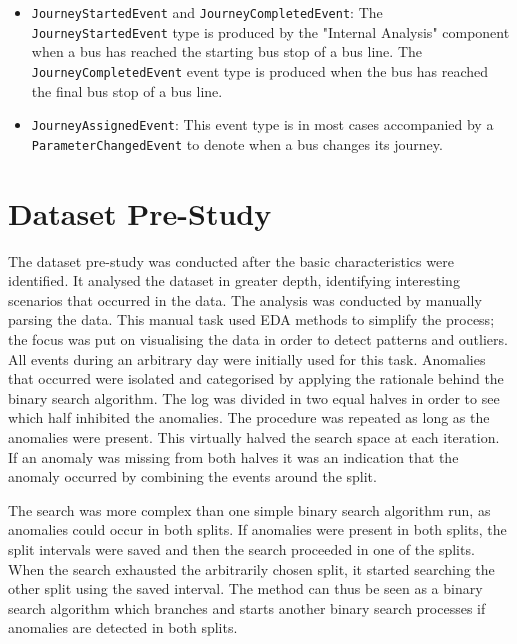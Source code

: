 \begin{itemize}
    \item \texttt{JourneyStartedEvent} and \texttt{JourneyCompletedEvent}: \newline
    The \texttt{JourneyStartedEvent} type is produced by the "Internal Analysis" component when a bus has reached the starting bus stop of a bus line.
    The \texttt{JourneyCompletedEvent} event type is produced when the bus has reached the final bus stop of a bus line.

    \item \texttt{JourneyAssignedEvent}:
    This event type is in most cases accompanied by a \texttt{ParameterChangedEvent} to denote when a bus changes its journey.
\end{itemize}

\section{Dataset Pre-Study}
The dataset pre-study was conducted after the basic characteristics were identified.
It analysed the dataset in greater depth, identifying interesting scenarios that occurred in the data.
The analysis was conducted by manually parsing the data.
This manual task used EDA methods to simplify the process; the focus was put on visualising the data in order to detect patterns and outliers.
All events during an arbitrary day were initially used for this task.
Anomalies that occurred were isolated and categorised by applying the rationale behind the binary search algorithm.
The log was divided in two equal halves in order to see which half inhibited the anomalies.
The procedure was repeated as long as the anomalies were present.
This virtually halved the search space at each iteration.
If an anomaly was missing from both halves it was an indication that the anomaly occurred by combining the events around the split.

The search was more complex than one simple binary search algorithm run, as anomalies could occur in both splits.
If anomalies were present in both splits, the split intervals were saved and then the search proceeded in one of the splits.
When the search exhausted the arbitrarily chosen split, it started searching the other split using the saved interval.
The method can thus be seen as a binary search algorithm which branches and starts another binary search processes if anomalies are detected in both splits. 

